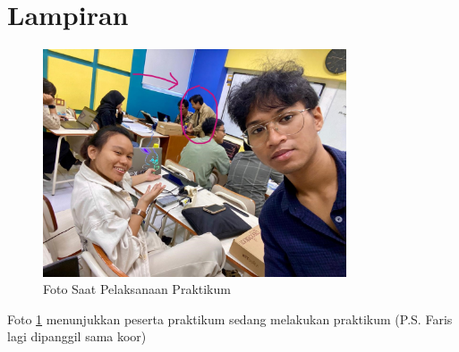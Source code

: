 \section*{Lampiran} %


\begin{figure}[H]
    \centering
    \includegraphics[width=0.8\textwidth]{img/foto_keren.jpeg}
    \caption{Foto Saat Pelaksanaan Praktikum}
    \label{fig:foto_keren}
\end{figure}

Foto \ref{fig:foto_keren} menunjukkan peserta praktikum sedang melakukan praktikum (P.S. Faris lagi dipanggil sama koor)